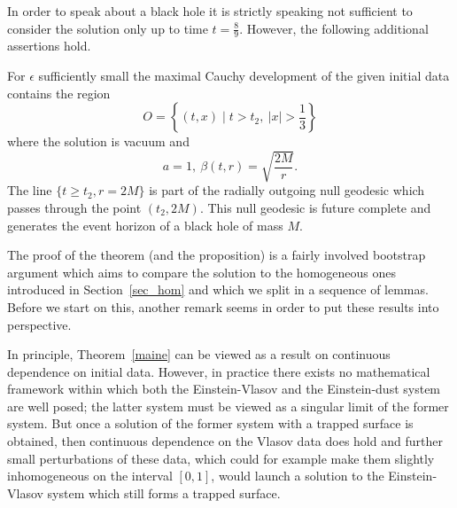 \documentclass[11pt]{article}
\begin{document}
In order to speak about a black hole it is strictly speaking
not sufficient to consider the solution only up to time $t=\frac{8}{9}$.
However, the following additional assertions hold.
%
\begin{proposition}\label{bh}
  For $\epsilon$ sufficiently small
  the maximal Cauchy development of the given initial data
  contains the region
  \[
  O = \left\{(t,x) \mid t > t_2,\ |x| > \frac{1}{3}\right\}
  \]
  where the solution is vacuum and
  \[
  a=1,\ \beta(t,r) = \sqrt{\frac{2 M}{r}}.
  \]
  The line $\{t\geq t_2, r=2 M\}$ is part of the radially outgoing
  null geodesic which passes through the point $(t_2,2 M)$. This
  null geodesic is future complete and generates the event horizon
  of a black hole of mass $M$.
\end{proposition}
%
The proof of the theorem (and the proposition) is a fairly
involved bootstrap argument which aims to compare
the solution to the homogeneous ones introduced in Section~\ref{sec_hom}
and which we split in a sequence of lemmas. Before we start on this,
another remark seems in order to put these results into perspective.
%
\begin{remark}\label{contdep}
  In principle, Theorem~\ref{maine} can be viewed as a result on continuous
  dependence on initial data. However, in practice there exists no
  mathematical framework within which both the Einstein-Vlasov and the
  Einstein-dust system are well posed; the latter system must be viewed
  as a singular limit of the former system. But once a solution of
  the former system with a trapped surface is obtained, then continuous
  dependence on the Vlasov data does hold and further small perturbations
  of these data, which could for example make them slightly inhomogeneous on
  the interval $[0,1]$, would launch a solution to the Einstein-Vlasov
  system which still forms a trapped surface.
\end{remark}
%
%
\end{document}
